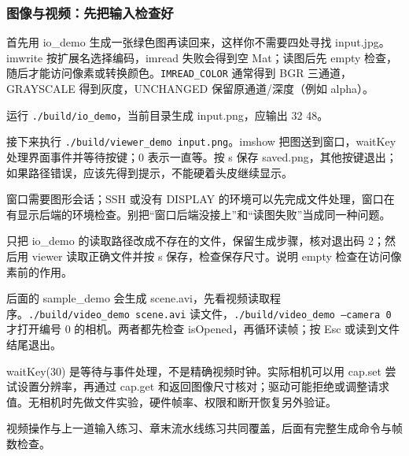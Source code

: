 \subsubsection{图像与视频：先把输入检查好}
首先用 io\_demo 生成一张绿色图再读回来，这样你不需要四处寻找 input.jpg。imwrite 按扩展名选择编码，imread 失败会得到空 Mat；读图后先 empty 检查，随后才能访问像素或转换颜色。\texttt{IMREAD\_COLOR} 通常得到 BGR 三通道，GRAYSCALE 得到灰度，UNCHANGED 保留原通道/深度（例如 alpha）。
\begin{example}
运行 \texttt{./build/io\_demo}，当前目录生成 input.png，应输出 32 48。
\begin{cvblock}

\end{cvblock}
接下来执行 \texttt{./build/viewer\_demo input.png}。imshow 把图送到窗口，waitKey 处理界面事件并等待按键；0 表示一直等。按 s 保存 saved.png，其他按键退出；如果路径错误，应该先得到提示，不能硬着头皮继续显示。
\begin{cvblock}

\end{cvblock}
窗口需要图形会话；SSH 或没有 DISPLAY 的环境可以先完成文件处理，窗口在有显示后端的环境检查。别把“窗口后端没接上”和“读图失败”当成同一种问题。
\end{example}
\begin{exercise}\label{ex:v2-cv-io}
只把 io\_demo 的读取路径改成不存在的文件，保留生成步骤，核对退出码 2；然后用 viewer 读取正确文件并按 s 保存，检查保存尺寸。说明 empty 检查在访问像素前的作用。
\end{exercise}

\begin{example}
后面的 sample\_demo 会生成 scene.avi，先看视频读取程序。\texttt{./build/video\_demo scene.avi} 读文件，\texttt{./build/video\_demo --camera 0} 才打开编号 0 的相机。两者都先检查 isOpened，再循环读帧；按 Esc 或读到文件结尾退出。
\begin{cvblock}

\end{cvblock}
waitKey(30) 是等待与事件处理，不是精确视频时钟。实际相机可以用 cap.set 尝试设置分辨率，再通过 cap.get 和返回图像尺寸核对；驱动可能拒绝或调整请求值。无相机时先做文件实验，硬件帧率、权限和断开恢复另外验证。
\end{example}
视频操作与上一道输入练习、章末流水线练习共同覆盖，后面有完整生成命令与帧数检查。

